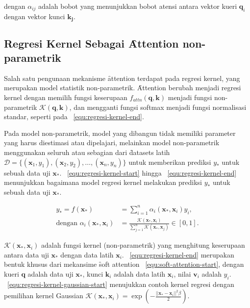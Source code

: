 	dengan $\alpha_{ij}$ adalah bobot yang menunjukkan bobot atensi antara vektor kueri $\mathbf{q}_i$ dengan vektor kunci $\mathbf{k_j}$. 

	\subsection{Regresi Kernel Sebagai \f{Attention} non-parametrik}
	\label{sec:regresi-kernel}

	Salah satu pengunaan mekanisme \f{attention} terdapat pada regresi kernel, yang merupakan model statistik non-parametrik. \f{Attention} berubah menjadi regresi kernel dengan memilih fungsi keserupaan $f_{attn}(\mathbf{q}, \mathbf{k})$ menjadi fungsi non-parametrik $\mathcal{K}(\mathbf{q}, \mathbf{k})$, dan mengganti fungsi softmax menjadi fungsi normalisasi standar, seperti pada \equ~\ref{equ:regresi-kernel-end}.
	
	Pada model non-parametrik, model yang dibangun tidak memiliki parameter yang harus diestimasi atau dipelajari, melainkan model non-parametrik menggunakan seluruh atau sebagian dari \f{datasets} latih $\mathcal{D} = \{(\mathbf{x}_1, y_1), (\mathbf{x}_2, y_2), \dots, (\mathbf{x}_n, y_n)\}$ untuk memberikan prediksi $y_*$ untuk sebuah data uji $\mathbf{x}_*$. \equ~\ref{equ:regresi-kernel-start} hingga \equ~\ref{equ:regresi-kernel-end} menunjukkan bagaimana model regresi kernel melakukan prediksi $y_*$ untuk sebuah data uji $\mathbf{x}_*$.

	\begin{align}
		\label{equ:regresi-kernel-start}
		y_{*} = f(\mathbf{x}_{*}) &= \sum_{i=1}^{n} \alpha_{i}(\mathbf{x}_{*},\mathbf{x}_i) y_i, \\
		\label{equ:regresi-kernel-end}
		\text{dengan } \alpha_{i}(\mathbf{x}_{*},\mathbf{x}_i) &= \frac{\mathcal{K}(\mathbf{x}_{*},\mathbf{x}_i)}{\sum_{j=1}^{n} \mathcal{K}(\mathbf{x}_{*},\mathbf{x}_j)} \in [0, 1].
	\end{align}

	$\mathcal{K}(\mathbf{x}_{*},\mathbf{x}_i)$ adalah fungsi kernel (non-parametrik) yang menghitung keserupaan antara data uji $\mathbf{x}_{*}$ dengan data latih $\mathbf{x}_i$. \equ~\ref{equ:regresi-kernel-end} merupakan bentuk khusus dari mekansime \f{soft attention} \equ~\ref{equ:soft-attention-start}, dengan kueri $\mathbf{q}$ adalah data uji $\mathbf{x}_{*}$, kunci $\mathbf{k}_i$ adalah data latih $\mathbf{x}_i$, nilai $\mathbf{v}_i$ adalah $y_i$. \equ~\ref{equ:regresi-kernel-gaussian-start} menujukkan contoh kernel regresi dengan pemilihan kernel Gaussian $\mathcal{K}(\mathbf{x}_{*},\mathbf{x}_i) = \exp(-\frac{||\mathbf{x}_{*} - \mathbf{x}_i||^2 \beta}{2})$.

